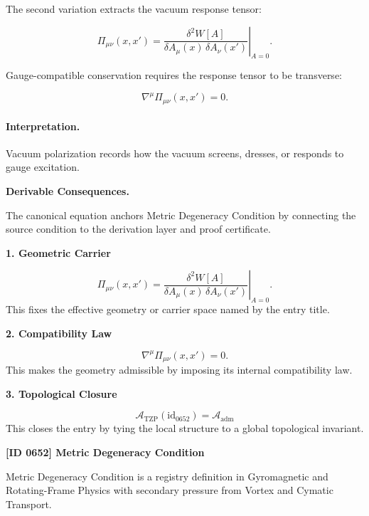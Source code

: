The second variation extracts the vacuum response tensor:

\begin{equation}
\Pi_{\mu\nu}(x,x')
=
\left.
\frac{\delta^2 W[A]}
{\delta A_\mu(x)\,\delta A_\nu(x')}
\right|_{A=0}.
\end{equation}

Gauge-compatible conservation requires the response tensor to be transverse:

\begin{equation}
\nabla^\mu \Pi_{\mu\nu}(x,x')=0 .
\end{equation}

\paragraph{Interpretation.}
Vacuum polarization records how the vacuum screens, dresses, or responds to gauge excitation.

\par\vspace{0.35em}
\noindent\textbf{Derivable Consequences.}\quad
\begingroup
\footnotesize
\raggedright
The canonical equation anchors Metric Degeneracy Condition by connecting the source condition to the derivation layer and proof certificate.
\par\endgroup

\noindent\textbf{1. Geometric Carrier}\par
\[
\Pi_{\mu\nu}(x,x') = \left. \frac{\delta^2 W[A]} {\delta A_\mu(x)\,\delta A_\nu(x')} \right|_{A=0}.
\]
\noindent This fixes the effective geometry or carrier space named by the entry title.\par
\noindent\textbf{2. Compatibility Law}\par
\[
\nabla^\mu \Pi_{\mu\nu}(x,x')=0.
\]
\noindent This makes the geometry admissible by imposing its internal compatibility law.\par
\noindent\textbf{3. Topological Closure}\par
\[
\mathcal{A}_{\mathrm{TZP}}(\mathrm{id}_{0652})=\mathcal{A}_{\mathrm{adm}}
\]
\noindent This closes the entry by tying the local structure to a global topological invariant.\par

\clearpage
\noindent\textbf{[ID 0652] Metric Degeneracy Condition}\par
\vspace{0.35em}
\begingroup\small
{}
Metric Degeneracy Condition is a registry definition in Gyromagnetic and Rotating-Frame Physics with secondary pressure from Vortex and Cymatic Transport.

